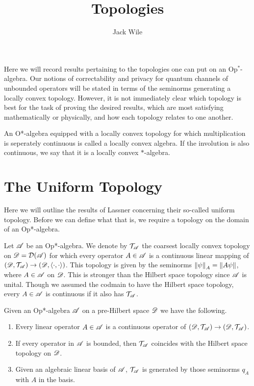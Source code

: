 \documentclass[../main.tex]{subfiles}
\title{Topologies}
\author{Jack Wile}
\date{}
\begin{document}
Here we will record results pertaining to the topologies one can put on an Op$^*$-algebra. Our notions of correctability and privacy
for quantum channels of unbounded operators will be stated in terms of the seminorms generating a locally convex topology. However, it is 
not immediately clear which topology is best for the task of proving the desired results, which are most satisfying mathematically or physically,
and how each topology relates to one another.

\begin{definition}
	An O*-algebra equipped with a locally convex topology for which multiplication is seperately continuous is called
	a locally convex algebra. If the involution is also continuous, we say that it is a locally convex $\ast$-algebra.
\end{definition}


\section*{The Uniform Topology}

Here we will outline the results of Lassner concerning their so-called uniform topology. Before we can define what that is, we require
a topology on the domain of an Op*-algebra.

Let $\mathscr{A}$ be an Op*-algebra. We denote by $\mathcal{T}_\mathscr{A}$ the coarsest locally convex topology on $\mathscr{D} = \mathcal{D}(\mathscr{A})$
for which every operator $A \in \mathscr{A}$ is a continuous linear mapping of $(\mathscr{D}, \mathcal{T}_\mathscr{A}) \to (\mathscr{D}, \langle \cdot, \cdot \rangle)$.
This topology is given by the seminorms $\left\lVert\psi\right\rVert_A = \|A\psi\|$, where $A \in \mathscr{A}$ on $\mathscr{D}$. This is stronger than the Hilbert 
space topology since $\mathscr{A}$ is unital. Though we assumed the codmain to have the Hilbert space topology, every $A \in \mathscr{A}$ is 
continuous if it also has $\mathcal{T}_\mathscr{A}$.

\begin{theorem}

	Given an Op*-algebra $\mathscr{A}$ on a pre-Hilbert space $\mathscr{D}$ we have the following.
	
	\begin{enumerate}
	\item Every linear operator $A \in \mathscr{A}$ is a continuous operator of $(\mathscr{D}, \mathcal{T}_\mathscr{A}) \to (\mathscr{D}, \mathcal{T}_\mathscr{A})$.
	\item If every operator in $\mathscr{A}$ is bounded, then $\mathcal{T}_\mathscr{A}$ coincides with the Hilbert space topology on $\mathscr{D}$.
	\item Given an algebraic linear basis of $\mathscr{A}$, $\mathcal{T}_\mathscr{A}$ is generated by those seminorms $q_A$ with $A$ in the basis.

	\end{enumerate}

\end{theorem}
\end{document}

